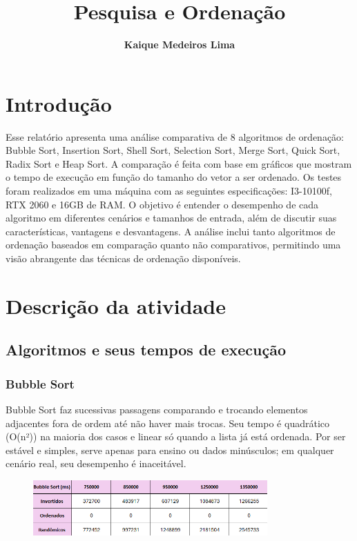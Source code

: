 \documentclass[a4paper, 12pt]{article}
\title{\bf Pesquisa e Ordenação}
\author{\bf Kaique Medeiros Lima}
\date{}
\begin{document}
\maketitle

\section{Introdução}
    Esse relatório apresenta uma análise comparativa de 8 algoritmos de ordenação: Bubble Sort, Insertion Sort, Shell Sort, Selection Sort, Merge Sort, Quick Sort, Radix Sort e Heap Sort. A comparação é feita com base em gráficos que mostram o tempo de execução em função do tamanho do vetor a ser ordenado. Os testes foram realizados em uma máquina com as seguintes especificações: I3-10100f, RTX 2060 e 16GB de RAM.
    O objetivo é entender o desempenho de cada algoritmo em diferentes cenários e tamanhos de entrada, além de discutir suas características, vantagens e desvantagens. A análise inclui tanto algoritmos de ordenação baseados em comparação quanto não comparativos, permitindo uma visão abrangente das técnicas de ordenação disponíveis.
\section{Descrição da atividade}
    \subsection{Algoritmos e seus tempos de execução}
        \subsubsection{Bubble Sort}
            Bubble Sort faz sucessivas passagens comparando e trocando elementos adjacentes fora de ordem até não haver mais trocas. Seu tempo é quadrático (O(n²)) na maioria dos casos e linear só quando a lista já está ordenada. Por ser estável e simples, serve apenas para ensino ou dados minúsculos; em qualquer cenário real, seu desempenho é inaceitável.

            \begin{figure}[ht]
                \centering
                \includegraphics[width=0.8\textwidth]{images/bubble.png}
            \end{figure}
\end{document}
